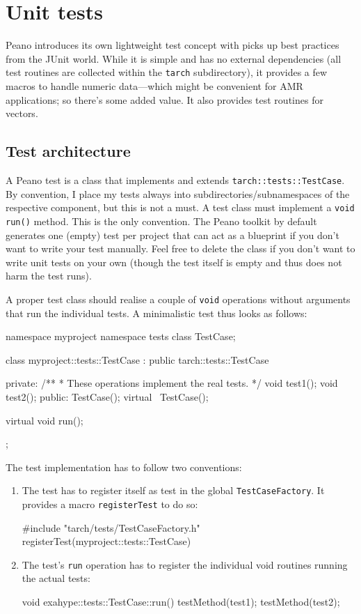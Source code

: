 \chapter{Unit tests}
\label{section:test}


Peano introduces its own lightweight test concept with picks up best practices
from the JUnit world. 
While it is simple and has no external dependencies (all test routines are
collected within the \texttt{tarch} subdirectory), it provides a few macros to
handle numeric data---which might be convenient for AMR applications; so
there's some added value. It also provides test routines for vectors.


\section{Test architecture}

A Peano test is a class that implements and extends
\texttt{tarch::tests::TestCase}.
By convention, I place my tests always into subdirectories/subnamespaces of the
respective component, but this is not a must.
A test class must implement a \texttt{void run()} method.
This is the only convention. 
The Peano toolkit by default generates one (empty) test per project that can act
as a blueprint if you don't want to write your test manually. 
Feel free to delete the class if you don't want to write unit tests on your own
(though the test itself is empty and thus does not harm the test runs).

A proper test class should realise a couple of \texttt{void} operations without
arguments that run the individual tests.
A minimalistic test thus looks as follows:

\begin{code}
namespace myproject {
  namespace tests {
    class TestCase;
  }
}

class myproject::tests::TestCase : public tarch::tests::TestCase {
 private:
  /**
   * These operations implement the real tests.
   */
  void test1();
  void test2();
 public:
  TestCase();
  virtual ~TestCase();

  virtual void run();
};
\end{code}

The test implementation has to follow two conventions:
\begin{enumerate}
  \item The test has to register itself as test in the global
  \texttt{TestCaseFactory}. It provides a macro \texttt{registerTest} to do so:
    \begin{code}
#include "tarch/tests/TestCaseFactory.h"
registerTest(myproject::tests::TestCase)
    \end{code}
  \item The test's \texttt{run} operation has to register the individual void
  routines running the actual tests:
  \begin{code}
void exahype::tests::TestCase::run() {
  testMethod(test1);
  testMethod(test2);
}
  \end{code}
\end{enumerate}

